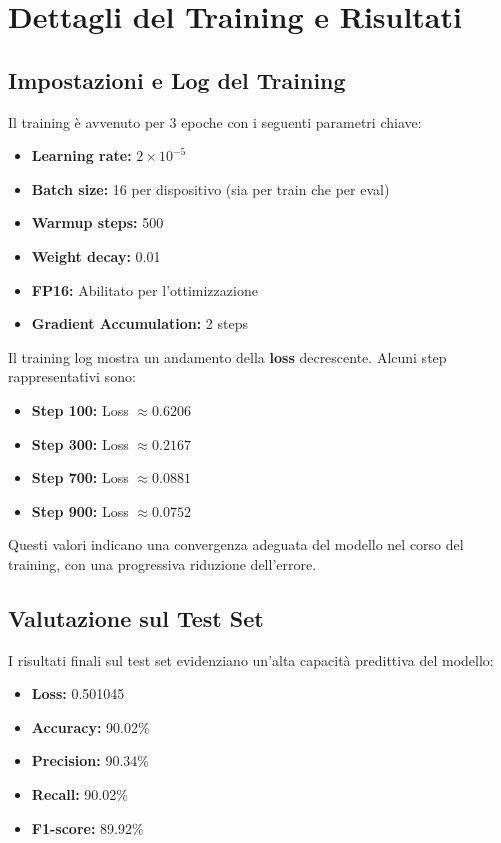 \documentclass[11pt,a4paper]{article}
\begin{document}
\section{Dettagli del Training e Risultati}
\subsection{Impostazioni e Log del Training}
Il training è avvenuto per 3 epoche con i seguenti parametri chiave:
\begin{itemize}
    \item \textbf{Learning rate:} $2 \times 10^{-5}$
    \item \textbf{Batch size:} 16 per dispositivo (sia per train che per eval)
    \item \textbf{Warmup steps:} 500
    \item \textbf{Weight decay:} 0.01
    \item \textbf{FP16:} Abilitato per l'ottimizzazione
    \item \textbf{Gradient Accumulation:} 2 steps
\end{itemize}

Il training log mostra un andamento della \textbf{loss} decrescente. Alcuni step rappresentativi sono:
\begin{itemize}
    \item \textbf{Step 100:} Loss $\approx 0.6206$
    \item \textbf{Step 300:} Loss $\approx 0.2167$
    \item \textbf{Step 700:} Loss $\approx 0.0881$
    \item \textbf{Step 900:} Loss $\approx 0.0752$
\end{itemize}
Questi valori indicano una convergenza adeguata del modello nel corso del training, con una progressiva riduzione dell’errore.

\subsection{Valutazione sul Test Set}
I risultati finali sul test set evidenziano un'alta capacità predittiva del modello:
\begin{itemize}
    \item \textbf{Loss:} 0.501045
    \item \textbf{Accuracy:} 90.02\%
    \item \textbf{Precision:} 90.34\%
    \item \textbf{Recall:} 90.02\%
    \item \textbf{F1-score:} 89.92\%
\end{itemize}
\end{document}

